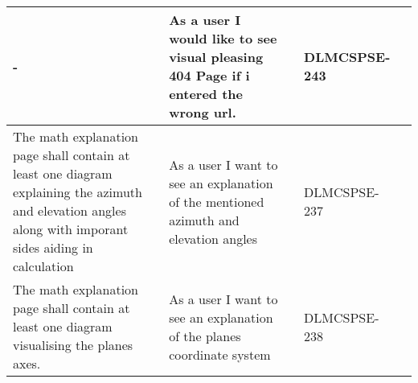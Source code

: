 \begin{xltabular}{\textwidth}{|X|X|M{1.8cm}|M{1.4cm}|M{1.3cm}|}
  - & As a user I would like to see visual pleasing 404 Page if i entered the wrong url. &  & {\color{purpleT}\ttfamily DLMCSPSE-243} &  \\ \hline 
  The math explanation page shall contain at least one diagram explaining the azimuth and elevation angles along with imporant sides aiding in calculation & As a user I want to see an explanation of the mentioned azimuth and elevation angles &  & {\color{purpleT}\ttfamily DLMCSPSE-237} &  \\ \hline 
  The math explanation page shall contain at least one diagram visualising the planes axes. & As a user I want to see an explanation of the planes coordinate system &  & {\color{purpleT}\ttfamily DLMCSPSE-238} &  \\ \hline 
  
\end{xltabular} 
 \egroup 
 \color{default}